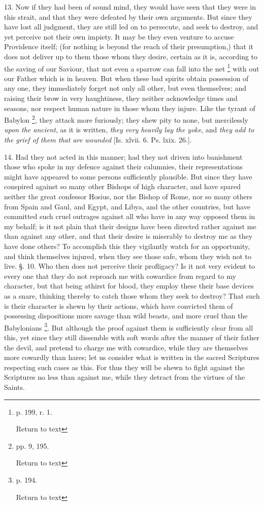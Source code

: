 13. Now if they had been of sound mind, they
would have seen that they were in this strait, and that they were
defeated by their own arguments. But since they have lost all
judgment, they are still led on to persecute, and seek to destroy, and
yet perceive not their own impiety. It may be they even venture to
accuse Providence itself; (for nothing is beyond the reach of their
presumption,) that it does not deliver up to them those whom they
desire, certain as it is, according to the saving of our Saviour, that
not even a sparrow can fall into the net \footnote{p. 199, r. 1.

Return to text} with out our Father which is in heaven. But when these bad
spirits obtain possession of any one, they immediately forget not only
all other, but even themselves; and raising their brow in very
haughtiness, they neither acknowledge times and seasons, nor respect
human nature in those whom they injure. Like the tyrant of Babylon \footnote{pp. 9, 195.

Return to text}, they attack more furiously; they shew pity to none, but
mercilessly \emph{upon the ancient}, as it is written, \emph{they very
heavily lay the yoke}, and \emph{they add to the grief of them that
are wounded} [Is. xlvii. 6. Ps. lxix. 26.].

14. Had they not acted in this manner; had they
not driven into banishment those who spoke in my defence against their
calumnies, their representations might have appeared to some persons
sufficiently plausible. But since they have conspired against so many
other Bishops of high character, and have spared neither the great
confessor Hosius, nor the Bishop of Rome, nor so many others from
Spain and Gaul, and Egypt, and Libya, and the other countries, but
have committed such cruel outrages against all who have in any way
opposed them in my behalf; is it not plain that their designs have
been directed rather against me than against any other, and that their
desire is miserably to destroy me as they have done others? To
accomplish this they vigilantly watch for an opportunity, and think
themselves injured, when they see those safe, whom they wish not to
live. §. 10. Who then does not perceive their profligacy? Is it not
very evident to every one that they do not reproach me with cowardice
from regard to my character, but that being athirst for blood, they
employ these their base devices as a snare, thinking thereby to catch
those whom they seek to destroy? That such is their character is shewn
by their actions, which have convicted them of possessing dispositions
more savage than wild beasts, and more cruel than the Babylonians \footnote{p. 194.

Return to text}. But although the proof against them is sufficiently clear
from all this, yet since they still dissemble with soft words after
the manner of their father the devil, and pretend to charge me with
cowardice, while they are themselves more cowardly than hares; let us
consider what is written in the sacred Scriptures respecting such
cases as this. For thus they will be shewn to fight against the
Scriptures no less than against me, while they detract from the
virtues of the Saints.

